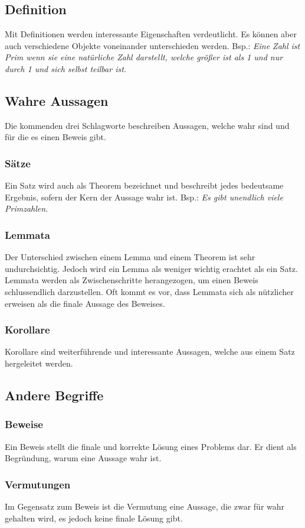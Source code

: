 \documentclass[12pt,a4paper]{article}
\theoremstyle{definition}
\begin{document}
\subsection*{Definition}
Mit Definitionen werden interessante Eigenschaften verdeutlicht.
Es können aber auch verschiedene Objekte voneinander unterschieden werden.\newline
Bsp.: \textit{Eine Zahl ist Prim wenn sie eine natürliche Zahl darstellt, welche größer ist als 1 und nur durch 1 und sich selbst teilbar ist.}
\subsection*{Wahre Aussagen}
Die kommenden drei Schlagworte beschreiben Aussagen, welche wahr sind und für die es einen Beweis gibt.
\subsubsection*{Sätze}
Ein Satz wird auch als Theorem bezeichnet und beschreibt jedes bedeutsame Ergebnis, sofern der Kern der Aussage wahr ist.\newline
Bsp.: \textit{Es gibt unendlich viele Primzahlen.}
\subsubsection*{Lemmata}
Der Unterschied zwischen einem Lemma und einem Theorem ist sehr undurchsichtig.
Jedoch wird ein Lemma als weniger wichtig erachtet als ein Satz.
Lemmata werden als Zwischenschritte herangezogen, um einen Beweis schlussendlich darzustellen.
Oft kommt es vor, dass Lemmata sich als nützlicher erweisen als die finale Aussage des Beweises.
\subsubsection*{Korollare}
Korollare sind weiterführende und interessante Aussagen, welche aus einem Satz hergeleitet werden.

\subsection*{Andere Begriffe}
\subsubsection*{Beweise}
Ein Beweis stellt die finale und korrekte Lösung eines Problems dar.
Er dient als Begründung, warum eine Aussage wahr ist.
\subsubsection*{Vermutungen}
Im Gegensatz zum Beweis ist die Vermutung eine Aussage, die zwar für wahr gehalten wird, es jedoch keine finale Lösung gibt.
\end{document}
